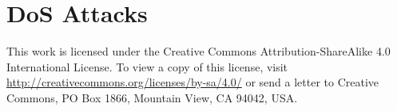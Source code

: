 \documentclass[10pt,a4paper]{article}
\begin{document}

\clearpage


\clearpage


\clearpage

\section{DoS Attacks}

\clearpage


\clearpage


\clearpage



\vspace*{\fill}
\centering
\tiny{This work is licensed under the Creative Commons Attribution-ShareAlike 4.0 International License. To view a copy of this license, visit \href{http://creativecommons.org/licenses/by-sa/4.0/}{http://creativecommons.org/licenses/by-sa/4.0/} or send a letter to Creative Commons, PO Box 1866, Mountain View, CA 94042, USA.}
\end{document}
